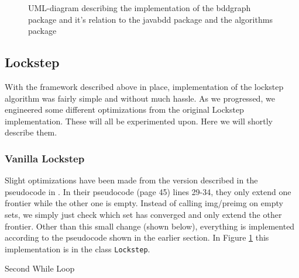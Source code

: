 \documentclass[../master/master.tex]{subfiles}
\begin{document}
\begin{figure}[H]
\begin{center}
\end{center}
\caption{UML-diagram describing the implementation of the bddgraph package and it's relation to the javabdd package and the algorithms package}
\label{main_uml}
\end{figure}

\subsection{Lockstep}
With the framework described above in place, implementation of the lockstep algorithm was fairly simple and without much hassle. As we progressed, we engineered some different optimizations from the original Lockstep implementation. These will all be experimented upon. Here we will shortly describe them.

\subsubsection{Vanilla Lockstep}
Slight optimizations have been made from the version described in the pseudocode in \cite{lockstep}. In their pseudocode (page 45) lines 29-34, they only extend one frontier while the other one is empty. Instead of calling img/preimg on empty sets, we simply just check which set has converged and only extend the other frontier.
Other than this small change (shown below), everything is implemented according to the pseudocode shown in the earlier section. In Figure \ref{main_uml} this implementation is in the class \texttt{Lockstep}.

\begin{algorithm}[H]
  \caption{Second While Loop}
  \begin{algorithmic}
      \EndWhile
      \Else
      \EndWhile
    \EndIf
  \end{algorithmic}
\end{algorithm}
\end{document}
